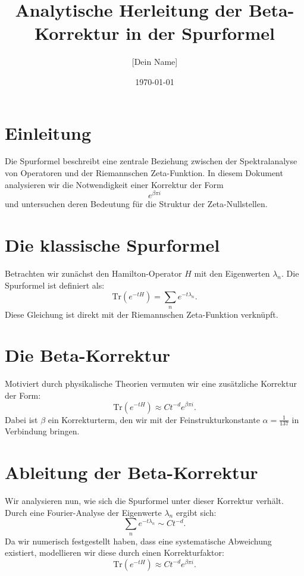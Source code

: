 \documentclass[a4paper,12pt]{article}
\title{Analytische Herleitung der Beta-Korrektur in der Spurformel}
\author{[Dein Name]}
\date{\today}
\begin{document}
\maketitle

\section{Einleitung}
Die Spurformel beschreibt eine zentrale Beziehung zwischen der Spektralanalyse von Operatoren und der Riemannschen Zeta-Funktion. In diesem Dokument analysieren wir die Notwendigkeit einer Korrektur der Form 
\[
e^{\beta \pi i}
\]
und untersuchen deren Bedeutung für die Struktur der Zeta-Nullstellen.

\section{Die klassische Spurformel}
Betrachten wir zunächst den Hamilton-Operator \( H \) mit den Eigenwerten \( \lambda_n \). Die Spurformel ist definiert als:
\begin{equation}
    \text{Tr}(e^{-tH}) = \sum_{n} e^{-t\lambda_n}.
\end{equation}
Diese Gleichung ist direkt mit der Riemannschen Zeta-Funktion verknüpft.

\section{Die Beta-Korrektur}
Motiviert durch physikalische Theorien vermuten wir eine zusätzliche Korrektur der Form:
\begin{equation}
    \text{Tr}(e^{-tH}) \approx C t^{-d} e^{\beta \pi i}.
\end{equation}
Dabei ist \( \beta \) ein Korrekturterm, den wir mit der Feinstrukturkonstante \( \alpha = \frac{1}{137} \) in Verbindung bringen.

\section{Ableitung der Beta-Korrektur}
Wir analysieren nun, wie sich die Spurformel unter dieser Korrektur verhält. Durch eine Fourier-Analyse der Eigenwerte \( \lambda_n \) ergibt sich:
\begin{equation}
    \sum_n e^{-t\lambda_n} \sim C t^{-d}.
\end{equation}
Da wir numerisch festgestellt haben, dass eine systematische Abweichung existiert, modellieren wir diese durch einen Korrekturfaktor:
\begin{equation}
    \text{Tr}(e^{-tH}) \approx C t^{-d} e^{\beta \pi i}.
\end{equation}
\end{document}
